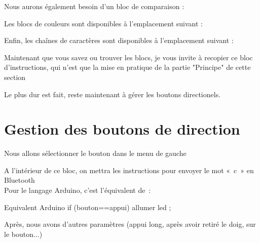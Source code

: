 
Nous aurons également besoin d'un bloc de comparaison : 



Les blocs de couleurs sont disponibles à l'emplacement suivant : 



Enfin, les chaînes de caractères sont disponibles à l'emplacement suivant : 




Maintenant que vous savez ou trouver les blocs, je vous invite à recopier ce bloc d'instructions, qui n'est que la mise en pratique de la partie "Principe" de cette section


Le plus dur est fait, reste maintenant à gérer les boutons directionels.

\section{Gestion des boutons de direction}

Nous allons sélectionner le bouton  dans le menu de gauche

 A l'intérieur de ce bloc, on mettra les instructions pour envoyer le mot « c » en Bluetooth \\
Pour le langage Arduino, c'est l'équivalent de :

\begin{Cpp}{Equivalent Arduino}
if (bouton==appui) {allumer led ;}     
\end{Cpp}
	        
Après, nous avons d'autres  paramètres (appui long, après avoir retiré le doig, sur le bouton...) \\


